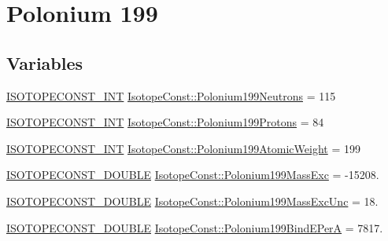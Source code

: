 \hypertarget{group___isotope_const-_polonium-_po199}{}\section{Polonium 199}
\label{group___isotope_const-_polonium-_po199}
\subsection*{Variables}
\begin{DoxyCompactItemize}
\item 
\mbox{\hyperlink{group___isotope_const-_macros_ga5f18360b3e99483a35c32d789e62621c}{I\+S\+O\+T\+O\+P\+E\+C\+O\+N\+S\+T\+\_\+\+I\+NT}} \mbox{\hyperlink{group___isotope_const-_polonium-_po199_ga467fc47eedb1709df274018fc9636d19}{Isotope\+Const\+::\+Polonium199\+Neutrons}} = 115
\item 
\mbox{\hyperlink{group___isotope_const-_macros_ga5f18360b3e99483a35c32d789e62621c}{I\+S\+O\+T\+O\+P\+E\+C\+O\+N\+S\+T\+\_\+\+I\+NT}} \mbox{\hyperlink{group___isotope_const-_polonium-_po199_ga9b19a5d563b4119f43865f87d9b7628a}{Isotope\+Const\+::\+Polonium199\+Protons}} = 84
\item 
\mbox{\hyperlink{group___isotope_const-_macros_ga5f18360b3e99483a35c32d789e62621c}{I\+S\+O\+T\+O\+P\+E\+C\+O\+N\+S\+T\+\_\+\+I\+NT}} \mbox{\hyperlink{group___isotope_const-_polonium-_po199_ga84febb4b10cca2d8373541dbc0e2d09d}{Isotope\+Const\+::\+Polonium199\+Atomic\+Weight}} = 199
\item 
\mbox{\hyperlink{group___isotope_const-_macros_ga8f45a7272ce02c0b4c65c44636ed719a}{I\+S\+O\+T\+O\+P\+E\+C\+O\+N\+S\+T\+\_\+\+D\+O\+U\+B\+LE}} \mbox{\hyperlink{group___isotope_const-_polonium-_po199_ga266d50e6471043410c17f90ea4519eb5}{Isotope\+Const\+::\+Polonium199\+Mass\+Exc}} = -\/15208.
\item 
\mbox{\hyperlink{group___isotope_const-_macros_ga8f45a7272ce02c0b4c65c44636ed719a}{I\+S\+O\+T\+O\+P\+E\+C\+O\+N\+S\+T\+\_\+\+D\+O\+U\+B\+LE}} \mbox{\hyperlink{group___isotope_const-_polonium-_po199_ga05dd1c06a70bb699a65236b42259db52}{Isotope\+Const\+::\+Polonium199\+Mass\+Exc\+Unc}} = 18.
\item 
\mbox{\hyperlink{group___isotope_const-_macros_ga8f45a7272ce02c0b4c65c44636ed719a}{I\+S\+O\+T\+O\+P\+E\+C\+O\+N\+S\+T\+\_\+\+D\+O\+U\+B\+LE}} \mbox{\hyperlink{group___isotope_const-_polonium-_po199_ga97ef633825b108b61bea62af3a318edf}{Isotope\+Const\+::\+Polonium199\+Bind\+E\+PerA}} = 7817.
\item 

\end{DoxyCompactItemize}
